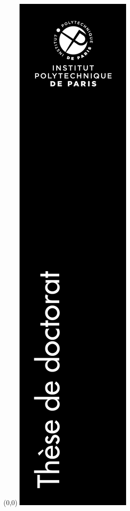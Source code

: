 \thispagestyle{empty}

\color{black} \hfill \vfill \tiny \ecodocnum
\begin{textblock}{5}(0,0)
	\includegraphics [scale=0.95]{media/bande.png}
	\vspace{300mm}
\end{textblock}


